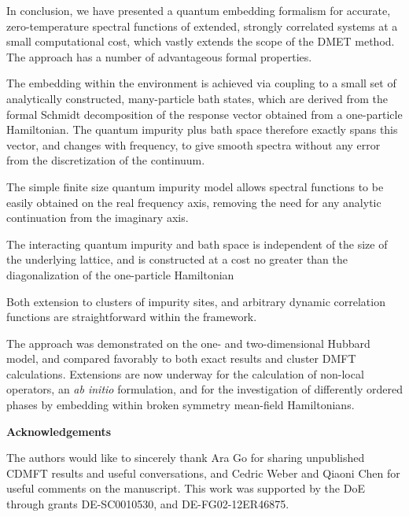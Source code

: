 \documentclass[aps,twocolumn,nobibnotes]{revtex4}
\begin{document}
In conclusion, we have presented a quantum embedding formalism for accurate, zero-temperature spectral functions of extended, strongly correlated systems 
at a small computational cost, which vastly 
extends the scope of the DMET method. The approach has a number of 
advantageous formal properties. 
\begin{inparaenum}
\item The embedding within the environment is achieved via coupling to a small set of analytically constructed, many-particle bath states,
    which are derived from the formal Schmidt decomposition of the response vector obtained from a one-particle Hamiltonian. The quantum impurity
    plus bath space therefore exactly spans this vector, and
    changes with frequency, to give smooth spectra without any error from the discretization of the continuum.
\item The simple finite size quantum impurity model allows spectral functions to be easily obtained on the real frequency axis, removing the 
    need for any analytic continuation from the imaginary axis.
\item The interacting quantum impurity and bath space is independent of the size of the underlying lattice, and is constructed at a cost no greater than the
    diagonalization of the one-particle Hamiltonian
\item Both extension to clusters of impurity sites, and arbitrary dynamic correlation functions are straightforward within the framework.
\end{inparaenum}
The approach was demonstrated on the one- and two-dimensional Hubbard model, and compared favorably to both exact results and cluster DMFT calculations. Extensions are now underway for the
calculation of non-local operators, an {\em ab initio} formulation, and for the investigation of differently ordered phases by embedding within broken symmetry mean-field Hamiltonians.

{\bf Acknowledgements}

The authors would like to sincerely thank Ara Go for sharing unpublished CDMFT results and useful 
conversations, and Cedric Weber and Qiaoni Chen for useful comments on the manuscript.
This work was supported by the DoE through grants DE-SC0010530, and DE-FG02-12ER46875.
\end{document}
